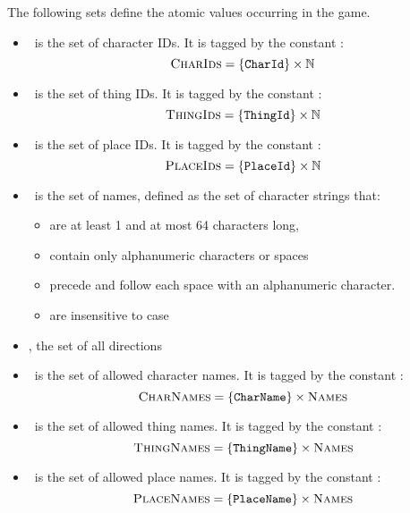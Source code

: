 The following sets define the atomic values occurring in the game.
\begin{itemize}
\item \charidset\ is the set of character IDs. It is tagged by the
  constant \charidtg:
  \[ \textsc{CharIds} = \{ \texttt{CharId} \} \times \mathbb{N} \]
\item \thingidset\ is the set of thing IDs. It is tagged by the
  constant \thingidtg:
  \[ \textsc{ThingIds} = \{ \texttt{ThingId} \} \times \mathbb{N} \]
\item \placeidset\ is the set of place IDs. It is tagged by the
  constant \placeidtg:
  \[ \textsc{PlaceIds} = \{ \texttt{PlaceId} \} \times \mathbb{N} \]
\item \nameset\ is the set of names, defined as the set of character
  strings that:
  \begin{itemize}
  \item are at least 1 and at most 64 characters long,
  \item contain only alphanumeric characters or spaces
  \item precede and follow each space with an alphanumeric character.
  \item are insensitive to case
  \end{itemize}
  \item \dirset, the set of all directions
\item \charnameset\ is the set of allowed character names. It is
  tagged by the constant \charnametg:
  \[ \textsc{CharNames} = \{ \texttt{CharName} \} \times \textsc{Names} \]
\item \thingnameset\ is the set of allowed thing names. It is tagged
  by the constant \thingnametg:
  \[ \textsc{ThingNames} = \{ \texttt{ThingName} \} \times \textsc{Names} \]
\item \placenameset\ is the set of allowed place names. It is tagged
  by the constant \placenametg:
  \[ \textsc{PlaceNames} = \{ \texttt{PlaceName} \} \times \textsc{Names} \]
\end{itemize}

